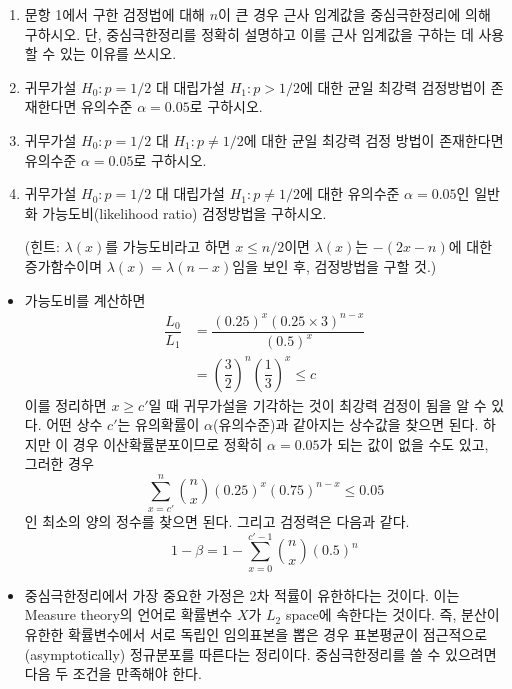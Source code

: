\documentclass[answers]{exam}
\begin{document}
\begin{questions}
\begin{enumerate}
    \item 문항 1에서 구한 검정법에 대해 $n$이 큰 경우 근사 임계값을 중심극한정리에 의해 구하시오. 단, 중심극한정리를 정확히 설명하고 이를 근사 임계값을 구하는 데 사용할 수 있는 이유를 쓰시오.
    \item 귀무가설 $H_{0}:p=1/2$ 대 대립가설 $H_{1}:p>1/2$에 대한 균일 최강력 검정방법이 존재한다면 유의수준 $\alpha=0.05$로 구하시오.
    \item 귀무가설 $H_{0}:p=1/2$ 대 $H_{1}:p\neq 1/2$에 대한 균일 최강력 검정 방법이 존재한다면 유의수준 $\alpha = 0.05$로 구하시오.
    \item 귀무가설 $H_{0}:p=1/2$ 대 대립가설 $H_{1}:p\neq 1/2$에 대한 유의수준 $\alpha=0.05$인 일반화 가능도비(likelihood ratio) 검정방법을 구하시오. \par
    (힌트: $\lambda\left(x\right)$를 가능도비라고 하면 $x\leq n/2$이면 $\lambda\left(x\right)$는 $-\left(2x-n\right)$에 대한 증가함수이며 $\lambda\left(x\right)=\lambda\left(n-x\right)$임을 보인 후, 검정방법을 구할 것.)
   \end{enumerate}
   \begin{solution}
    \begin{itemize}
      \item 가능도비를 계산하면
      \begin{align}
        \dfrac{L_{0}}{L_{1}} &= \dfrac{\left(0.25\right)^{x}\left(0.25\times 3\right)^{n-x}}{\left(0.5\right)^{x}}\\
        &= \left(\dfrac{3}{2}\right)^{n}\left(\dfrac{1}{3}\right)^{x} \leq c
      \end{align}
      이를 정리하면 $x \geq c'$일 때 귀무가설을 기각하는 것이 최강력 검정이 됨을 알 수 있다. 어떤 상수 $c'$는 유의확률이 $\alpha$(유의수준)과 같아지는 상수값을 찾으면 된다. 하지만 이 경우 이산확률분포이므로 정확히 $\alpha=0.05$가 되는 값이 없을 수도 있고, 그러한 경우 
      \begin{equation}
        \sum_{x=c'}^{n}{{n}\choose{x}}\left(0.25\right)^{x}\left(0.75\right)^{n-x} \leq 0.05
      \end{equation}
      인 최소의 양의 정수를 찾으면 된다. 그리고 검정력은 다음과 같다.
      \begin{equation}
        1-\beta = 1-\sum_{x=0}^{c'-1}{{n}\choose{x}}\left(0.5\right)^{n}
      \end{equation}
      \item 중심극한정리에서 가장 중요한 가정은 2차 적률이 유한하다는 것이다. 이는 Measure theory의 언어로 확률변수 $X$가 $L_{2}$ space에 속한다는 것이다. 즉, 분산이 유한한 확률변수에서 서로 독립인 임의표본을 뽑은 경우 표본평균이 점근적으로(asymptotically) 정규분포를 따른다는 정리이다. 중심극한정리를 쓸 수 있으려면 다음 두 조건을 만족해야 한다.

\end{itemize}
\end{solution}
\end{questions}
\end{document}
